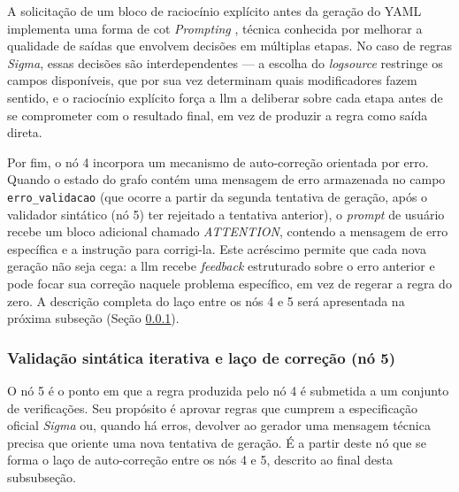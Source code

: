 A solicitação de um bloco de raciocínio explícito antes da geração do YAML implementa uma forma de \acrlong{cot} \textit{Prompting} \cite{wei2022chain}, técnica conhecida por melhorar a qualidade de saídas que envolvem decisões em múltiplas etapas. 
No caso de regras \textit{Sigma}, essas decisões são interdependentes --- a escolha do \textit{logsource} restringe os campos disponíveis, que por sua vez determinam quais modificadores fazem sentido, e o raciocínio explícito força a \gls{llm} a deliberar sobre cada etapa antes de se comprometer com o resultado final, em vez de produzir a regra como saída direta.

Por fim, o nó 4 incorpora um mecanismo de auto-correção orientada por erro. 
Quando o estado do grafo contém uma mensagem de erro armazenada no campo \texttt{erro\_validacao} (que ocorre a partir da segunda tentativa de geração, após o validador sintático (nó 5) ter rejeitado a tentativa anterior), o \textit{prompt} de usuário recebe um bloco adicional chamado \textit{ATTENTION}, contendo a mensagem de erro específica e a instrução para corrigi-la. 
Este acréscimo permite que cada nova geração não seja cega: a \gls{llm} recebe \textit{feedback} estruturado sobre o erro anterior e pode focar sua correção naquele problema específico, em vez de regerar a regra do zero. 
A descrição completa do laço entre os nós 4 e 5 será apresentada na próxima subseção (Seção \ref{subsec:no5}).


\subsubsection{Validação sintática iterativa e laço de correção (nó 5)}\label{subsec:no5}

O nó 5 é o ponto em que a regra produzida pelo nó 4 é submetida a um conjunto de verificações. 
Seu propósito é aprovar regras que cumprem a especificação oficial \textit{Sigma} ou, quando há erros, devolver ao gerador uma mensagem técnica precisa que oriente uma nova tentativa de geração. 
É a partir deste nó que se forma o laço de auto-correção entre os nós 4 e 5, descrito ao final desta subsubseção.

